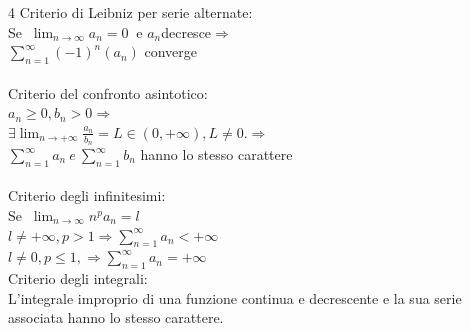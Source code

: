 \documentclass[a4paper, oneside]{article}
\begin{document}
    \begin{multicols}{4}
        \noindent
        Criterio di Leibniz per serie alternate:\\
        Se $\ \lim_{n \to \infty } a_n = 0 \ $ e $a_n$decresce$ \Rightarrow$ \\
        $\sum_{n = 1}^{\infty }(-1)^{n}(a_n)$ converge\\
        \columnbreak\\
        Criterio del confronto asintotico:\\
        $a_n \geq 0, b_n > 0 \Rightarrow $ \\
        $\exists \lim_{n \to +\infty } \frac{a_n}{b_n} = L \in (0, +\infty ), L \neq 0. \Rightarrow$  \\
        $\sum_{n = 1}^{\infty } a_n \ e \ \sum_{n = 1}^{\infty } b_n$ hanno lo stesso carattere\\
        \columnbreak\\
        Criterio degli infinitesimi:\\
        Se $\ \lim_{n \to \infty } n^{p}a_n = l \ $ \\
        $l \ne + \infty , p > 1 \Rightarrow \sum_{n = 1}^{\infty } a_n < + \infty $\\
        $l \ne 0, p \leq 1, \Rightarrow \sum_{n = 1}^{\infty }a_n = + \infty $    
        \columnbreak\\
        Criterio degli integrali:\\
        L'integrale improprio di una funzione continua e decrescente e la sua serie
        associata hanno lo stesso carattere.
    \end{multicols}
\end{document}
